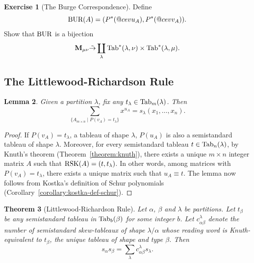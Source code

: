 \documentclass[11pt]{amsproc}
\makeatletter
\DeclareRobustCommand{\cev}[1]{%
  \mathpalette\do@cev{#1}%
}
\newcommand{\do@cev}[2]{%
  \fix@cev{#1}{+}%
  \reflectbox{$\m@th#1\vec{\reflectbox{$\fix@cev{#1}{-}\m@th#1#2\fix@cev{#1}{+}$}}$}%
  \fix@cev{#1}{-}%
}
\newcommand{\fix@cev}[2]{%
  \ifx#1\displaystyle
    \mkern#23mu
  \else
    \ifx#1\textstyle
      \mkern#23mu
    \else
      \ifx#1\scriptstyle
        \mkern#22mu
      \else
        \mkern#22mu
      \fi
    \fi
  \fi
}
\newtheorem{theorem}{Theorem}[subsection]
\newtheorem{lemma}[theorem]{Lemma}
\theoremstyle{definition}
\theoremstyle{example}
\newtheorem{exercise}[theorem]{Exercise}
\newcommand{\Tab}{\textup{Tab}}
\newcommand{\rsk}{\textup{RSK}}
\newcommand{\bur}{\textup{BUR}}
\makeatother
\begin{document}
\begin{exercise}
  [The Burge Correspondence]
  \label{exercise:burge}
  Define
  \begin{displaymath}
    \bur(A) = (P^*(\cev u_A), P^*(\cev v_A)).
  \end{displaymath}
  Show that $\bur$ is a bijection
  \begin{displaymath}
    \mathbf M_{\mu\nu}\tilde \to \coprod_\lambda \Tab^*(\lambda,\nu)\times \Tab^*(\lambda,\mu).
  \end{displaymath}
\end{exercise}
\subsection{The Littlewood-Richardson Rule}
\label{sec:littlewood-richardson}
\begin{lemma}
  \label{lemma:section}
  Given a partition $\lambda$, fix any $t_\lambda\in \Tab_m(\lambda)$.
  Then
  \begin{displaymath}
    \sum_{\{A_{m\times n}\mid P(v_A) = t_\lambda\}} x^{u_A} = s_\lambda(x_1,\dotsc,x_n).
  \end{displaymath}
\end{lemma}
\begin{proof}
  If $P(v_A) = t_\lambda$, a tableau of shape $\lambda$, $P(u_A)$ is also a semistandard tableau of shape $\lambda$.
  Moreover, for every semistandard tableau $t\in \Tab_n(\lambda)$,  by Knuth's theorem (Theorem~\ref{theorem:knuth}), there exists a unique $m\times n$ integer matrix $A$ such that $\rsk(A) = (t, t_\lambda)$.
  In other words, among matrices with $P(v_A)=t_\lambda$, there exists a unique matrix such that $u_A\equiv t$.
  The lemma now follows from Kostka's definition of Schur polynomials (Corollary~\ref{corollary:kostka-def-schur}).
\end{proof}
\begin{theorem}
  [Littlewood-Richardson Rule]
  Let $\alpha$, $\beta$ and $\lambda$ be partitions.
  Let $t_\beta$ be any semistandard tableau in $\Tab_b(\beta)$ for some integer $b$.
  Let $c^\lambda_{\alpha\beta}$ denote the number of semistandard skew-tableaux of shape $\lambda/\alpha$ whose reading word is Knuth-equivalent to $t_\beta$, the unique tableau of shape and type $\beta$.
  Then
  \begin{displaymath}
    s_\alpha s_\beta = \sum_\lambda c^\lambda_{\alpha\beta} s_\lambda.
  \end{displaymath}
\end{theorem}
\end{document}
